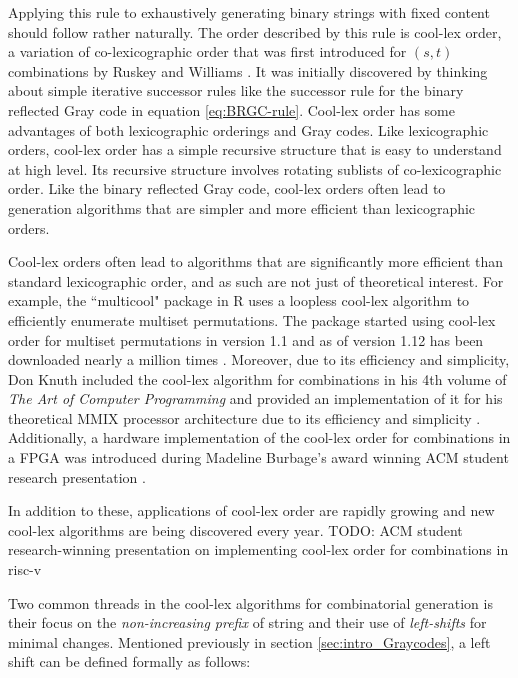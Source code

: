 Applying this rule to exhaustively generating binary strings with fixed content should follow rather naturally.  The order described by this rule is 
cool-lex order, a variation of co-lexicographic order that was first introduced for $(s,t)$ combinations by Ruskey and Williams \cite{ruskey2005generating} \cite{ruskey2008generating}.  It was initially discovered by thinking about simple iterative successor rules like the successor rule for the binary reflected Gray code in equation \ref{eq:BRGC-rule}. Cool-lex order has some advantages of both lexicographic orderings and Gray codes.  Like lexicographic orders, cool-lex order has a simple recursive structure that is easy to understand at  high level.  Its recursive structure involves rotating sublists of co-lexicographic order.  Like the binary reflected Gray code, cool-lex orders often lead to generation algorithms that are simpler and more efficient than lexicographic orders.   %

Cool-lex orders often lead to algorithms that are significantly more efficient than standard lexicographic order, and as such are not just of theoretical interest.  For example, the ``multicool" package in R uses a loopless cool-lex algorithm to efficiently enumerate multiset permutations.   The package started using cool-lex order for multiset permutations in version 1.1 and as of version 1.12 has been downloaded nearly a million times \cite{multicool_2021}.  Moreover, due to its efficiency and simplicity, Don Knuth included the cool-lex algorithm for combinations in his 4th volume of \emph{The Art of Computer Programming} and provided an implementation of it for his theoretical MMIX processor architecture due to its efficiency and simplicity \cite{knuth2015art}.  Additionally, a hardware implementation of the cool-lex order for combinations in a FPGA was introduced during Madeline Burbage's award winning ACM student research presentation \cite{burbage2020cool}.

In addition to these, applications of cool-lex order are rapidly growing and new cool-lex algorithms are being discovered every year.  
TODO: ACM student research-winning presentation on implementing cool-lex order for combinations in risc-v

Two common threads in the cool-lex algorithms for combinatorial generation is their focus on the \emph{non-increasing prefix} of string and their use of \emph{left-shifts} for minimal changes.  Mentioned previously in section \ref{sec:intro_Graycodes}, a left shift can be defined formally as follows:


